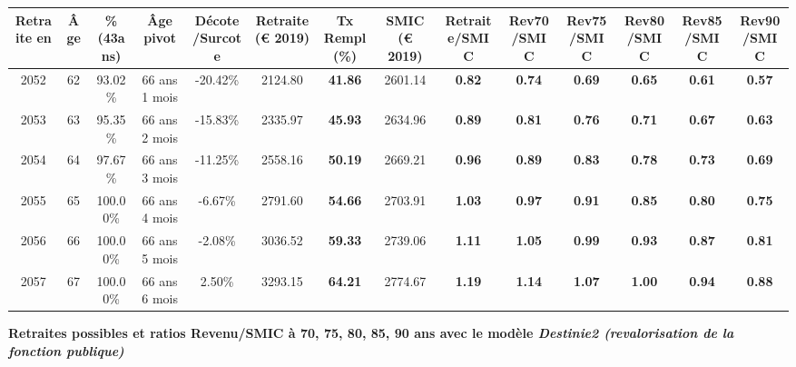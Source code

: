 \begin{adjustbox}{max width=\textwidth} 
\begin{tabular}[htb]{|c|c||c|c|c||c|c||c||c|c|c|c|c|c|} 
\hline 
 Retraite en &  Âge &  \%(43ans) &  Âge pivot &  Décote/Surcote &  Retraite (\euro{} 2019) &  Tx Rempl(\%) &  SMIC (\euro{} 2019) &  Retraite/SMIC &  Rev70/SMIC &  Rev75/SMIC &  Rev80/SMIC &  Rev85/SMIC &  Rev90/SMIC \\ 
\hline \hline 
 2052 &  62 &  93.02\% &  66 ans 1 mois &  -20.42\% &  2124.80 &  {\bf 41.86} &  2601.14 &  {\bf {\color{red} 0.82}} &  {\bf {\color{red} 0.74}} &  {\bf {\color{red} 0.69}} &  {\bf {\color{red} 0.65}} &  {\bf {\color{red} 0.61}} &  {\bf {\color{red} 0.57}} \\ 
\hline 
 2053 &  63 &  95.35\% &  66 ans 2 mois &  -15.83\% &  2335.97 &  {\bf 45.93} &  2634.96 &  {\bf {\color{red} 0.89}} &  {\bf {\color{red} 0.81}} &  {\bf {\color{red} 0.76}} &  {\bf {\color{red} 0.71}} &  {\bf {\color{red} 0.67}} &  {\bf {\color{red} 0.63}} \\ 
\hline 
 2054 &  64 &  97.67\% &  66 ans 3 mois &  -11.25\% &  2558.16 &  {\bf 50.19} &  2669.21 &  {\bf {\color{red} 0.96}} &  {\bf {\color{red} 0.89}} &  {\bf {\color{red} 0.83}} &  {\bf {\color{red} 0.78}} &  {\bf {\color{red} 0.73}} &  {\bf {\color{red} 0.69}} \\ 
\hline 
 2055 &  65 &  100.00\% &  66 ans 4 mois &  -6.67\% &  2791.60 &  {\bf 54.66} &  2703.91 &  {\bf 1.03} &  {\bf {\color{red} 0.97}} &  {\bf {\color{red} 0.91}} &  {\bf {\color{red} 0.85}} &  {\bf {\color{red} 0.80}} &  {\bf {\color{red} 0.75}} \\ 
\hline 
 2056 &  66 &  100.00\% &  66 ans 5 mois &  -2.08\% &  3036.52 &  {\bf 59.33} &  2739.06 &  {\bf 1.11} &  {\bf 1.05} &  {\bf {\color{red} 0.99}} &  {\bf {\color{red} 0.93}} &  {\bf {\color{red} 0.87}} &  {\bf {\color{red} 0.81}} \\ 
\hline 
 2057 &  67 &  100.00\% &  66 ans 6 mois &  2.50\% &  3293.15 &  {\bf 64.21} &  2774.67 &  {\bf 1.19} &  {\bf 1.14} &  {\bf 1.07} &  {\bf 1.00} &  {\bf {\color{red} 0.94}} &  {\bf {\color{red} 0.88}} \\ 
\hline 
\hline 
\end{tabular} 
\end{adjustbox} 
 
 \vspace{0.1cm} 
{\bf \noindent Retraites possibles et ratios Revenu/SMIC à 70, 75, 80, 85, 90 ans avec le modèle \emph{Destinie2 (revalorisation de la fonction publique)}}  
 
